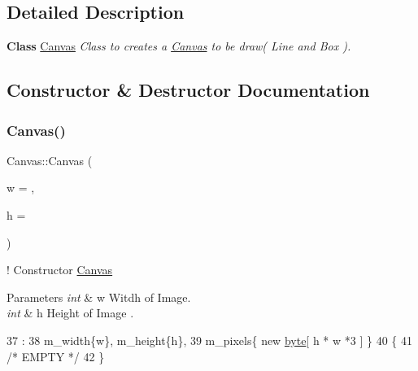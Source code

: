 \subsection{Detailed Description}
{\bfseries Class} \hyperlink{classCanvas}{Canvas} {\itshape Class to creates a \hyperlink{classCanvas}{Canvas} to be draw( Line and Box ).} 

\subsection{Constructor \& Destructor Documentation}
\mbox{\label{classCanvas_aa232b6ded8df451736a9e042e103c4e2}} 
\subsubsection{\texorpdfstring{Canvas()}{Canvas()}\hspace{0.1cm}{\footnotesize\ttfamily [1/2]}}
{\footnotesize\ttfamily Canvas\+::\+Canvas (\begin{DoxyParamCaption}\item[{int}]{w = {},  }\item[{int}]{h = {} }\end{DoxyParamCaption})\hspace{0.3cm}{\ttfamily [inline]}}



! Constructor \hyperlink{classCanvas}{Canvas} 


\begin{DoxyParams}{Parameters}
{\em int} & w Witdh of Image. \\
\hline
{\em int} & h Height of Image . \\
\hline
\end{DoxyParams}

\begin{DoxyCode}
37                                        :
38             m\_width\{w\}, m\_height\{h\},
39             m\_pixels\{ \textcolor{keyword}{new} \hyperlink{canvas_8h_a0c8186d9b9b7880309c27230bbb5e69d}{byte}[ h * w *3 ] \}
40         \{
41             \textcolor{comment}{/* EMPTY */}
42         \}
\end{DoxyCode}
\mbox{\label{classCanvas_a63c450c44bae6e3ff76a07ad0a15a750}} 
